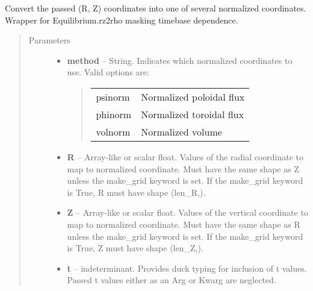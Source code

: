\documentclass[letterpaper,10pt,english]{sphinxmanual}
\begin{document}
\begin{fulllineitems}
\begin{fulllineitems}
\begin{quote}
\begin{description}
\end{description}\end{quote}

\end{fulllineitems}


\begin{fulllineitems}
\label{eqtools:eqtools.eqdskreader.EqdskReader.rz2rho}
Convert the passed (R, Z) coordinates into one of several normalized coordinates.
Wrapper for Equilibrium.rz2rho masking timebase dependence.
\begin{quote}\begin{description}
\item[{Parameters}] \leavevmode\begin{itemize}
\item {} 
\textbf{method} -- 
String.
Indicates which normalized coordinates to use.
Valid options are:
\begin{quote}

\begin{tabulary}{\linewidth}{|L|L|}
\hline

psinorm
 & 
Normalized poloidal flux
\\

phinorm
 & 
Normalized toroidal flux
\\

volnorm
 & 
Normalized volume
\\
\hline\end{tabulary}

\end{quote}


\item {} 
\textbf{R} -- Array-like or scalar float.
Values of the radial coordinate to
map to normalized coordinate. Must have the same shape as Z
unless the make\_grid keyword is set. If the make\_grid keyword
is True, R must have shape (len\_R,).

\item {} 
\textbf{Z} -- Array-like or scalar float.
Values of the vertical coordinate to
map to normalized coordinate. Must have the same shape as R
unless the make\_grid keyword is set. If the make\_grid keyword
is True, Z must have shape (len\_Z,).

\item {} 
\textbf{t} -- indeterminant.
Provides duck typing for inclusion of t values. Passed t values
either as an Arg or Kwarg are neglected.


\end{itemize}
\end{description}
\end{quote}
\end{fulllineitems}
\end{fulllineitems}
\end{document}
